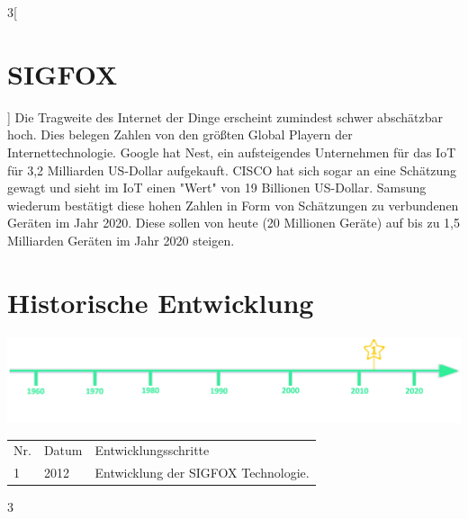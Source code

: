\begin{multicols}{3}[\section{SIGFOX}]
Die Tragweite des Internet der Dinge erscheint zumindest schwer abschätzbar hoch. Dies belegen Zahlen von den größten Global Playern der Internettechnologie. Google hat Nest, ein aufsteigendes Unternehmen für das IoT für 3,2 Milliarden US-Dollar aufgekauft. CISCO hat sich sogar an eine Schätzung gewagt und sieht im IoT einen "Wert" von 19 Billionen US-Dollar. Samsung wiederum bestätigt diese hohen Zahlen in Form von Schätzungen zu verbundenen Geräten im Jahr 2020. Diese sollen von heute (20 Millionen Geräte) auf bis zu 1,5 Milliarden Geräten im Jahr 2020 steigen.~\cite{sigfox.3}


\end{multicols}
\newpage
\section*{Historische Entwicklung}
\includegraphics[width=\textwidth]{Kapitel/SIGFOX/Grafiken/Zeitstrahl}
\par
\noindent
{}
\begin{tabular}{p{0.5 cm}p{1.5 cm}p{15.55 cm}}
	Nr. & Datum & Entwicklungsschritte\\
	1 & 2012 & Entwicklung der SIGFOX Technologie.\\
\end{tabular}
\par
\begin{multicols}{3}

\printbibliography[segment=15,heading=subbibliography]
\end{multicols}


\newpage
